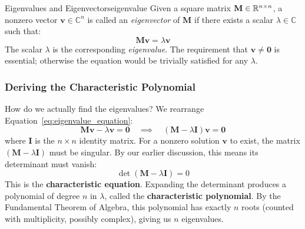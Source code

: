\begin{definition}{Eigenvalues and Eigenvectors}{eigenvalue}
Given a square matrix $\mathbf{M} \in \mathbb{R}^{n \times n}$, a nonzero vector $\mathbf{v} \in \mathbb C^n$ is called an \emph{eigenvector} of $\mathbf{M}$ if there exists a scalar $\lambda\in\mathbb C$ such that:
\begin{equation}
\label{eq:eigenvalue_equation}
   \mathbf{M}\mathbf{v} = \lambda \mathbf{v}
\end{equation}
The scalar $\lambda$ is the corresponding \emph{eigenvalue}. The requirement that $\mathbf{v} \neq \mathbf{0}$ is essential; otherwise the equation would be trivially satisfied for any $\lambda$.
\end{definition}

\subsubsection{Deriving the Characteristic Polynomial}

How do we actually find the eigenvalues? We rearrange Equation~\eqref{eq:eigenvalue_equation}:
\begin{equation}
    \mathbf{M}\mathbf{v} - \lambda \mathbf{v} = \mathbf{0} \quad \implies \quad (\mathbf{M} - \lambda \mathbf{I})\mathbf{v} = \mathbf{0}
\end{equation}
where $\mathbf{I}$ is the $n \times n$ identity matrix. For a nonzero solution $\mathbf{v}$ to exist, the matrix $(\mathbf{M} - \lambda \mathbf{I})$ must be singular. By our earlier discussion, this means its determinant must vanish:
\begin{equation}
\label{eq:characteristic_polynomial}
    \det(\mathbf{M} - \lambda \mathbf{I}) = 0
\end{equation}
This is the \textbf{characteristic equation}. Expanding the determinant produces a polynomial of degree $n$ in $\lambda$, called the \textbf{characteristic polynomial}. By the Fundamental Theorem of Algebra, this polynomial has exactly $n$ roots (counted with multiplicity, possibly complex), giving us $n$ eigenvalues.

